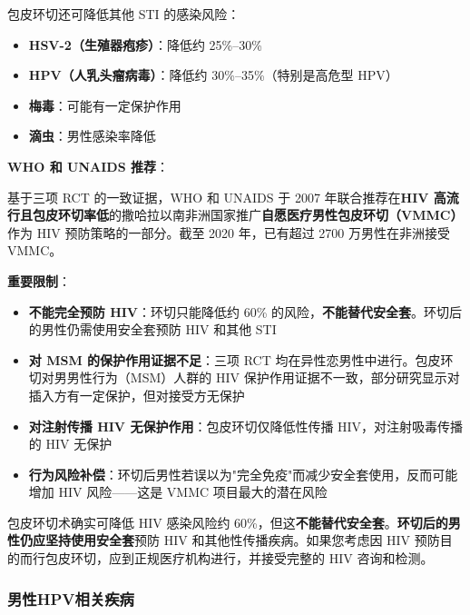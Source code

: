 包皮环切还可降低其他 STI 的感染风险：
\begin{itemize}[leftmargin=2cm]
	\item \textbf{HSV-2（生殖器疱疹）}：降低约 25\%--30\%
	\item \textbf{HPV（人乳头瘤病毒）}：降低约 30\%--35\%（特别是高危型 HPV）
	\item \textbf{梅毒}：可能有一定保护作用
	\item \textbf{滴虫}：男性感染率降低
\end{itemize}

\vspace{0.5em}
\noindent\textbf{WHO 和 UNAIDS 推荐}：

基于三项 RCT 的一致证据，WHO 和 UNAIDS 于 2007 年联合推荐在\textbf{HIV 高流行且包皮环切率低}的撒哈拉以南非洲国家推广\textbf{自愿医疗男性包皮环切（VMMC）}作为 HIV 预防策略的一部分。截至 2020 年，已有超过 2700 万男性在非洲接受 VMMC。

\vspace{0.5em}
\noindent\textbf{重要限制}：

\begin{itemize}[leftmargin=2cm]
	\item \textbf{不能完全预防 HIV}：环切只能降低约 60\% 的风险，\textbf{不能替代安全套}。环切后的男性仍需使用安全套预防 HIV 和其他 STI
	\item \textbf{对 MSM 的保护作用证据不足}：三项 RCT 均在异性恋男性中进行。包皮环切对男男性行为（MSM）人群的 HIV 保护作用证据不一致，部分研究显示对插入方有一定保护，但对接受方无保护
	\item \textbf{对注射传播 HIV 无保护作用}：包皮环切仅降低性传播 HIV，对注射吸毒传播的 HIV 无保护
	\item \textbf{行为风险补偿}：环切后男性若误以为"完全免疫"而减少安全套使用，反而可能增加 HIV 风险——这是 VMMC 项目最大的潜在风险
\end{itemize}

\begin{tcolorbox}[colback=pink!5!white,colframe=red!50!black,title=贴心小叮咛]
包皮环切术确实可降低 HIV 感染风险约 60\%，但这\textbf{不能替代安全套}。\textbf{环切后的男性仍应坚持使用安全套}预防 HIV 和其他性传播疾病。如果您考虑因 HIV 预防目的而行包皮环切，应到正规医疗机构进行，并接受完整的 HIV 咨询和检测。
\end{tcolorbox}

\subsubsection{男性HPV相关疾病}
\label{subsec:male_hpv}

